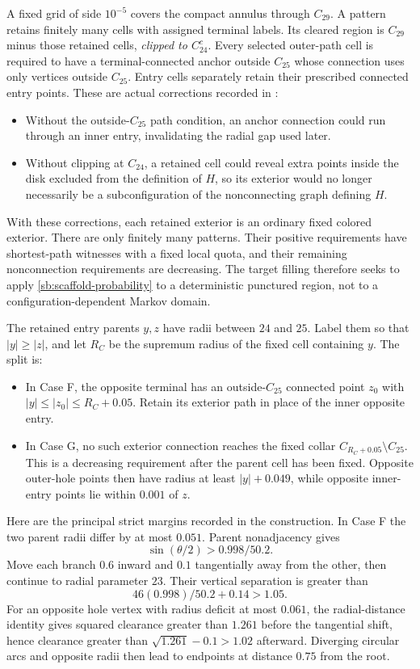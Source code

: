 \documentclass[11pt,a4paper]{article}
\theoremstyle{definition}
\theoremstyle{remark}
\numberwithin{equation}{section}
\begin{document}
A fixed grid of side $10^{-5}$ covers the compact annulus through
$C_{29}$. A pattern retains finitely many cells with assigned terminal
labels. Its cleared region is $C_{29}$ minus those retained cells,
\emph{clipped to $C_{24}^c$}. Every selected outer-path cell is required
to have a terminal-connected anchor outside $C_{25}$ whose connection
uses only vertices outside $C_{25}$. Entry cells separately retain
their prescribed connected entry points. These are actual corrections
recorded in :
\begin{itemize}
 \item Without the outside-$C_{25}$ path condition, an anchor connection
 could run through an inner entry, invalidating the radial gap used
 later.
 \item Without clipping at $C_{24}$, a retained cell could reveal extra
 points inside the disk excluded from the definition of $H$, so its
 exterior would no longer necessarily be a subconfiguration of the
 nonconnecting graph defining $H$.
\end{itemize}
With these corrections, each retained exterior is an ordinary fixed
colored exterior. There are only finitely many patterns. Their
positive requirements have shortest-path witnesses with a fixed local
quota, and their remaining nonconnection requirements are decreasing.
The target filling therefore seeks to apply
\eqref{sb:scaffold-probability} to a deterministic punctured region,
not to a configuration-dependent Markov domain.

The retained entry parents $y,z$ have radii between $24$ and $25$.
Label them so that $|y|\ge|z|$, and let $R_C$ be the supremum radius
of the fixed cell containing $y$. The split is:
\begin{itemize}
 \item In Case F, the opposite terminal has an outside-$C_{25}$
 connected point $z_0$ with $|y|\le|z_0|\le R_C+0.05$.
 Retain its exterior path in place of the inner opposite entry.
 \item In Case G, no such exterior connection reaches the fixed collar
 $C_{R_C+0.05}\setminus C_{25}$. This is a decreasing requirement
 after the parent cell has been fixed. Opposite outer-hole points then
 have radius at least $|y|+0.049$, while opposite inner-entry points
 lie within $0.001$ of $z$.
\end{itemize}

Here are the principal strict margins recorded in the construction.
In Case F the two parent radii differ by at most $0.051$. Parent
nonadjacency gives
\[
 \sin(\theta/2)>0.998/50.2.
\]
Move each branch $0.6$ inward and $0.1$ tangentially away from the
other, then continue to radial parameter $23$. Their vertical
separation is greater than
\[
 46(0.998)/50.2+0.14>1.05.
\]
For an opposite hole vertex with radius deficit at most $0.061$, the
radial-distance identity gives squared clearance greater than
$1.261$ before the tangential shift, hence clearance greater than
$\sqrt{1.261}-0.1>1.02$ afterward. Diverging circular arcs and
opposite radii then lead to endpoints at distance $0.75$ from the
root.
\end{document}
